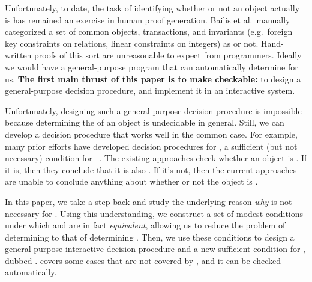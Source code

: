 Unfortunately, to date, the task of identifying whether or not an object
actually is \invariantconfluent{} has remained an exercise in human proof
generation. Bailis et al.\ manually categorized a set of common objects,
transactions, and invariants (e.g.\ foreign key constraints on relations,
linear constraints on integers) as \invariantconfluent{} or not. Hand-written
proofs of this sort are unreasonable to expect from programmers. Ideally we
would have a general-purpose program that can automatically determine
\invariantconfluence{} for us.  \textbf{The first main thrust of this paper is
to make \invariantconfluence{} checkable:} to design a general-purpose
\invariantconfluence{} decision procedure, and implement it in an interactive
system.

Unfortunately, designing such a general-purpose decision procedure is
impossible because determining the \invariantconfluence{} of an object is
undecidable in general. Still, we can develop a decision procedure that works
well in the common case.
%
For example, many prior efforts have developed decision procedures for
\emph{\invariantclosure{}}, a sufficient (but not necessary) condition for
\invariantconfluence{}~\cite{li2012making, li2014automating}. The existing
approaches check whether an object is \invariantclosed{}. If it is, then they
conclude that it is also \invariantconfluent{}. If it's not, then the current
approaches are unable to conclude anything about whether or not the object is
\invariantconfluent{}.

In this paper, we take a step back and study the underlying reason \emph{why}
\invariantclosure{} is not necessary for \invariantconfluence{}.
%
%
Using this understanding, we construct a set of modest conditions under which
\invariantclosure{} and \invariantconfluence{} are in fact \emph{equivalent},
allowing us to reduce the problem of determining \invariantconfluence{} to that
of determining \invariantclosure{}.
%
Then, we use these conditions to design a general-purpose interactive
\invariantconfluence{} decision procedure and a new sufficient condition for
\invariantconfluence{}, dubbed \emph{\mergereducibility}. \Mergereducibility{}
covers some cases that are not covered by \invariantclosure{}, and it can be
checked automatically.


